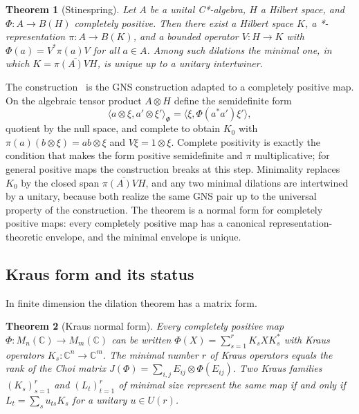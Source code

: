 \documentclass[11pt,letterpaper]{article}
\newtheorem{theorem}{Theorem}[section]
\theoremstyle{definition}
\theoremstyle{remark}
\begin{document}
\begin{theorem}[Stinespring]
\label{thm:stinespring}
Let $A$ be a unital C*-algebra, $H$ a Hilbert space, and $\Phi \colon A \to B(H)$ completely positive. Then there exist a Hilbert space $K$, a *-representation $\pi \colon A \to B(K)$, and a bounded operator $V \colon H \to K$ with $\Phi(a) = V^* \pi(a) V$ for all $a \in A$. Among such dilations the minimal one, in which $K = \overline{\pi(A) V H}$, is unique up to a unitary intertwiner.
\end{theorem}

The construction~\cite{stinespring} is the GNS construction adapted to a completely positive map. On the algebraic tensor product $A \otimes H$ define the semidefinite form
\[
\langle a \otimes \xi, a' \otimes \xi' \rangle_\Phi = \langle \xi, \Phi(a^* a') \xi' \rangle,
\]
quotient by the null space, and complete to obtain $K_0$ with $\pi(a)(b \otimes \xi) = ab \otimes \xi$ and $V \xi = 1 \otimes \xi$. Complete positivity is exactly the condition that makes the form positive semidefinite and $\pi$ multiplicative; for general positive maps the construction breaks at this step. Minimality replaces $K_0$ by the closed span $\overline{\pi(A) V H}$, and any two minimal dilations are intertwined by a unitary, because both realize the same GNS pair up to the universal property of the construction. The theorem is a normal form for completely positive maps: every completely positive map has a canonical representation-theoretic envelope, and the minimal envelope is unique.

\subsection{Kraus form and its status}

In finite dimension the dilation theorem has a matrix form.

\begin{theorem}[Kraus normal form]
\label{thm:kraus}
Every completely positive map $\Phi \colon M_n(\mathbb{C}) \to M_m(\mathbb{C})$ can be written $\Phi(X) = \sum_{s=1}^{r} K_s X K_s^*$ with Kraus operators $K_s \colon \mathbb{C}^n \to \mathbb{C}^m$. The minimal number $r$ of Kraus operators equals the rank of the Choi matrix $J(\Phi) = \sum_{i,j} E_{ij} \otimes \Phi(E_{ij})$. Two Kraus families $(K_s)_{s=1}^{r}$ and $(L_t)_{t=1}^{r}$ of minimal size represent the same map if and only if $L_t = \sum_s u_{ts} K_s$ for a unitary $u \in U(r)$.
\end{theorem}
\end{document}
